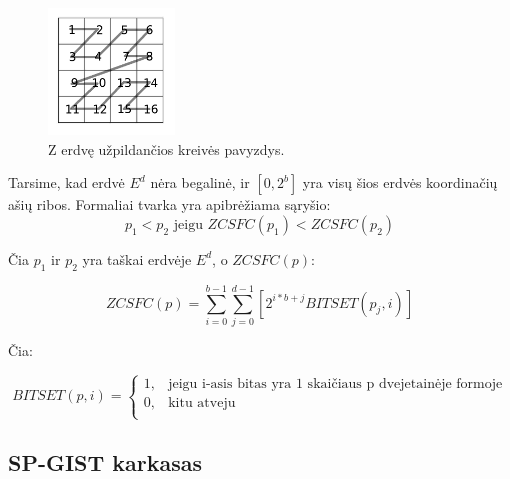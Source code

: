 \begin{figure}[H]
\begin{center}
\includegraphics[width=0.3\textwidth]{img/ZCurveSpaceFillingCurve.png}
\caption{Z erdvę užpildančios kreivės pavyzdys.}
\label{img:ZCurveSpaceFillingCurve}
\end{center}
\end{figure}

Tarsime, kad erdvė $E^d$ nėra begalinė, ir $[0, 2^b]$ yra visų šios erdvės koordinačių ašių ribos.
Formaliai tvarka yra apibrėžiama sąryšio:
\begin{equation}
	p_1 < p_2 \text{ jeigu } ZCSFC(p_1) < ZCSFC(p_2)
\label{eq:ZCurveSFCComparison}
\end{equation}

Čia $p_1$ ir $p_2$ yra taškai erdvėje $E^d$, o $ZCSFC(p)$:

\begin{equation}
	ZCSFC(p) = \sum_{i=0}^{b-1} \sum_{j=0}^{d-1} [2^{i*b+j} BITSET(p_j, i)]
\label{eq:ZCurveSFCValue}
\end{equation}

Čia:

\begin{equation}
	BITSET(p, i)=
\begin{cases}
	1,& \text{jeigu } \text{i-asis bitas yra 1 skaičiaus p dvejetainėje formoje}\\
	0,& \text{kitu atveju}\\
\end{cases}
\label{eq:Bitset}
\end{equation}






\subsection{SP-GIST karkasas}
